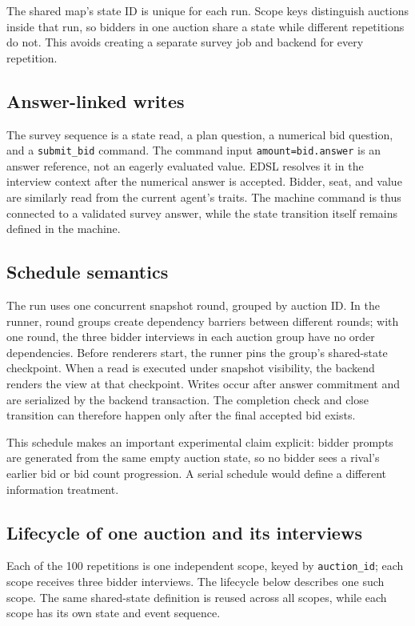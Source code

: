 \documentclass[11pt]{article}
\begin{document}
The shared map's state ID is unique for each run. Scope keys distinguish auctions inside that run, so bidders in one auction share a state while different repetitions do not. This avoids creating a separate survey job and backend for every repetition.

\subsection{Answer-linked writes}

The survey sequence is a state read, a plan question, a numerical bid question, and a \texttt{submit\_bid} command. The command input \texttt{amount=bid.answer} is an answer reference, not an eagerly evaluated value. EDSL resolves it in the interview context after the numerical answer is accepted. Bidder, seat, and value are similarly read from the current agent's traits. The machine command is thus connected to a validated survey answer, while the state transition itself remains defined in the machine.

\subsection{Schedule semantics}

The run uses one concurrent snapshot round, grouped by auction ID. In the runner, round groups create dependency barriers between different rounds; with one round, the three bidder interviews in each auction group have no order dependencies. Before renderers start, the runner pins the group's shared-state checkpoint. When a read is executed under snapshot visibility, the backend renders the view at that checkpoint. Writes occur after answer commitment and are serialized by the backend transaction. The completion check and close transition can therefore happen only after the final accepted bid exists.

This schedule makes an important experimental claim explicit: bidder prompts are generated from the same empty auction state, so no bidder sees a rival's earlier bid or bid count progression. A serial schedule would define a different information treatment.

\subsection{Lifecycle of one auction and its interviews}

Each of the 100 repetitions is one independent scope, keyed by \texttt{auction\_id}; each scope receives three bidder interviews. The lifecycle below describes one such scope. The same shared-state definition is reused across all scopes, while each scope has its own state and event sequence.
\end{document}
